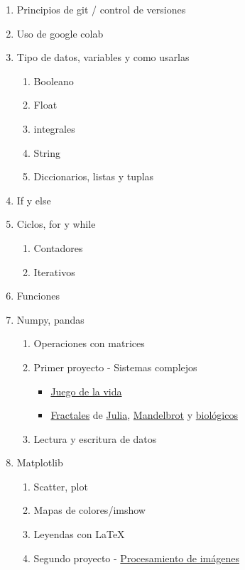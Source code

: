 \documentclass[12pt,letterpaper]{article}
\begin{document}
\begin{enumerate}
    \item Principios de git / control de versiones
    \item Uso de google colab
    \item Tipo de datos, variables y como usarlas
    \begin{enumerate}
        \item Booleano
        \item Float
        \item integrales
        \item String
        \item Diccionarios, listas y tuplas
    \end{enumerate}
    \item If y else
    \item Ciclos, for y while
    \begin{enumerate}
        \item Contadores
        \item Iterativos
    \end{enumerate}
    \item Funciones
    \item Numpy, pandas
    \begin{enumerate}
        \item Operaciones con matrices
        \item Primer proyecto - Sistemas complejos
        \begin{itemize}
            \item \href{https://en.wikipedia.org/wiki/Conway%27s_Game_of_Life}{Juego de la vida}
            \item \href{https://es.wikipedia.org/wiki/Fractal}{Fractales} de \href{https://es.wikipedia.org/wiki/Conjunto_de_Julia}{Julia}, \href{https://es.wikipedia.org/wiki/Conjunto_de_Mandelbrot}{Mandelbrot} y \href{10.13140/RG.2.2.24949.40167}{biológicos}
        \end{itemize}
        \item Lectura y escritura de datos
    \end{enumerate}
    \item Matplotlib
    \begin{enumerate}
        \item Scatter, plot
        \item Mapas de colores/imshow
        \item Leyendas con LaTeX
        \item Segundo proyecto - \href{https://es.wikipedia.org/wiki/Procesamiento_digital_de_im%C3%A1genes}{Procesamiento de imágenes}

\end{enumerate}
\end{enumerate}
\end{document}
